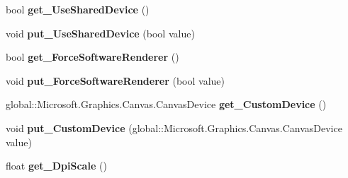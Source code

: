 \begin{DoxyCompactItemize}
bool {\bfseries get\+\_\+\+Use\+Shared\+Device} ()
\item 
\mbox{\label{class_microsoft_1_1_graphics_1_1_canvas_1_1_u_i_1_1_xaml_1_1_canvas_virtual_control_ab0da6bda58aa043b46cbaff104c201b3}} 
void {\bfseries put\+\_\+\+Use\+Shared\+Device} (bool value)
\item 
\mbox{\label{class_microsoft_1_1_graphics_1_1_canvas_1_1_u_i_1_1_xaml_1_1_canvas_virtual_control_a64a8765e8e095db44794d48a077da8e9}} 
bool {\bfseries get\+\_\+\+Force\+Software\+Renderer} ()
\item 
\mbox{\label{class_microsoft_1_1_graphics_1_1_canvas_1_1_u_i_1_1_xaml_1_1_canvas_virtual_control_a9f35b2877fdd4f3fe08ce54230303da9}} 
void {\bfseries put\+\_\+\+Force\+Software\+Renderer} (bool value)
\item 
\mbox{\label{class_microsoft_1_1_graphics_1_1_canvas_1_1_u_i_1_1_xaml_1_1_canvas_virtual_control_ac22a92a0de8e5c91b70355745c645d57}} 
global\+::\+Microsoft.\+Graphics.\+Canvas.\+Canvas\+Device {\bfseries get\+\_\+\+Custom\+Device} ()
\item 
\mbox{\label{class_microsoft_1_1_graphics_1_1_canvas_1_1_u_i_1_1_xaml_1_1_canvas_virtual_control_a31200b6eb7450c52a82dd628f921c5e6}} 
void {\bfseries put\+\_\+\+Custom\+Device} (global\+::\+Microsoft.\+Graphics.\+Canvas.\+Canvas\+Device value)
\item 
\mbox{\label{class_microsoft_1_1_graphics_1_1_canvas_1_1_u_i_1_1_xaml_1_1_canvas_virtual_control_a0c92dd8419ce69933e85cefe0b59d3d0}} 
float {\bfseries get\+\_\+\+Dpi\+Scale} ()
\item 
\mbox{\label{class_microsoft_1_1_graphics_1_1_canvas_1_1_u_i_1_1_xaml_1_1_canvas_virtual_control_a87a799ec726f0a3f29547c2594c373e1}} 

\end{DoxyCompactItemize}
